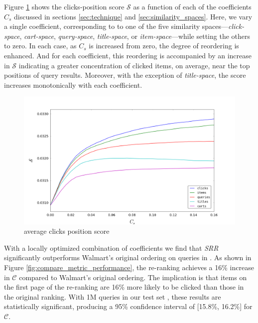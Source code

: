 \documentclass{article}
\begin{document}
Figure \ref{fig:avg_clicks_position_score} shows the clicks-position score $\mathscr{S}$ 
as a function of each of the coefficients $C_s$ discussed in sections \ref{sec:technique} 
and \ref{sec:similarity_spaces}. Here, we vary a single coefficient, corresponding to
to one of the five similarity spaces---{\em click-space}, {\em cart-space}, {\em 
query-space}, {\em title-space}, or {\em item-space}---while setting the others to zero.
In each case, as $C_s$ is increased from zero, the degree of reordering is enhanced.
And for each coefficient, this reordering is accompanied by an increase in $\mathscr{S}$
indicating a greater concentration of clicked items, on average, near the top positions 
of query results. Moreover, with the exception of {\em title-space}, the score increases 
monotonically with each coefficient.


\begin{figure}[htbp!]
    \centering
    \includegraphics[width=\textwidth]{000050_0_48chunk_k100_i2_n100_avg_click_position_score_0-0_16.png}
    \caption{average clicks position score}
    \label{fig:avg_clicks_position_score}
\end{figure}

With a locally optimized combination of coefficients we find that {\em SRR} significantly 
outperforms Walmart’s original ordering on queries in {\chi}. As shown in Figure
\ref{fig:compare_metric_performance}, the re-ranking achieves a 16\% increase
in $\mathscr{C}$ compared to Walmart’s original ordering. The implication is
that items on the first page of the re-ranking are 16\% more likely to be clicked than those
in the original ranking. With 1M queries in our test set {\chi}, these results are
statistically significant, producing a 95\% confidence interval of [15.8\%,
16.2\%] for $\mathscr{C}$.
\end{document}
